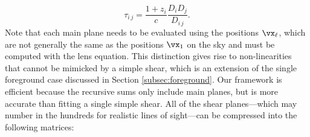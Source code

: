 \begin{equation}
\tau_{i\,j} = \frac{ 1 + z_i}{c} \frac{D_i D_j}{D_{i\,j}}.
\end{equation}
Note that each main plane needs to be evaluated using the positions $\vx_\ell$, which are not generally the same as the positions $\vx_1$ on the sky and must be computed with the lens equation. This distinction gives rise to non-linearities that cannot be mimicked by a simple shear, which is an extension of the single foreground case discussed in Section \ref{subsec:foreground}. Our framework is efficient because the recursive sums only include main planes, but is more accurate than fitting a single simple shear. All of the shear planes---which may number in the hundreds for realistic lines of sight---can be compressed into the following matrices: